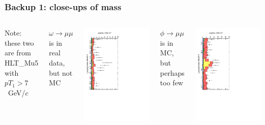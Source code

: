 \documentclass[compress]{beamer}
\begin{document}
\begin{frame}
\frametitle{Backup 1: close-ups of mass}

\begin{columns}
Note: these two are from HLT\_Mu5 with $pT_1 > 7$~GeV/$c$

\vspace{0.25 cm}
{\scriptsize $\omega \to \mu\mu$ is in real data, but not MC}

\includegraphics[height=\linewidth, angle=90]{Mu5_mass_omg.pdf}

\vspace{0.1 cm}
{\scriptsize $\phi \to \mu\mu$ is in MC, but perhaps too few}

\includegraphics[height=\linewidth, angle=90]{Mu5_mass_phi.pdf}


\end{columns}
\end{frame}
\end{document}
